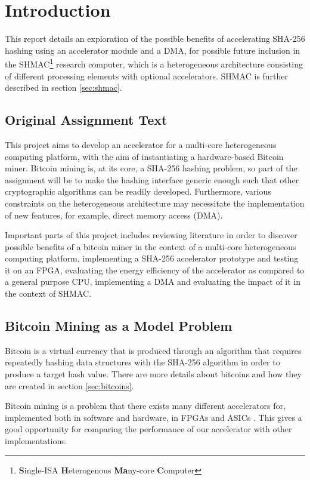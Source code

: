 \chapter{Introduction}

This report details an exploration of the possible benefits of accelerating
SHA-256 hashing using an accelerator module and a DMA, for possible future
inclusion in the SHMAC\footnote{\textbf{S}ingle-ISA \textbf{H}eterogenous
\textbf{Ma}ny-core \textbf{C}omputer} research computer, which is a
heterogeneous architecture consisting of different processing elements with
optional accelerators. SHMAC is further described in section \ref{sec:shmac}.

\section{Original Assignment Text}

This project aims to develop an accelerator for a multi-core heterogeneous
computing platform, with the aim of instantiating a hardware-based Bitcoin miner.
Bitcoin mining is, at its core, a SHA-256 hashing problem, so part of the
assignment will be to make the hashing interface generic enough such that other
cryptographic algorithms can be readily developed. Furthermore, various constraints
on the heterogeneous architecture may necessitate the implementation of new
features, for example, direct memory access (DMA).

Important parts of this project includes reviewing literature in order to discover
possible benefits of a bitcoin miner in the context of a multi-core heterogeneous
computing platform, implementing a SHA-256 accelerator prototype and testing it on
an FPGA, evaluating the energy efficiency of the accelerator as compared to a
general purpose CPU, implementing a DMA and evaluating the impact of it in the context
of SHMAC.

\section{Bitcoin Mining as a Model Problem}

Bitcoin is a virtual currency that is produced through an algorithm that
requires repeatedly hashing data structures with the SHA-256 algorithm
in order to produce a target hash value. There are more details about
bitcoins and how they are created in section \ref{sec:bitcoins}.

Bitcoin mining is a problem that there exists many different accelerators
for, implemented both in software and hardware, in FPGAs and ASICs \cite{dark-silicon}.
This gives a good opportunity for comparing the performance of our
accelerator with other implementations.

